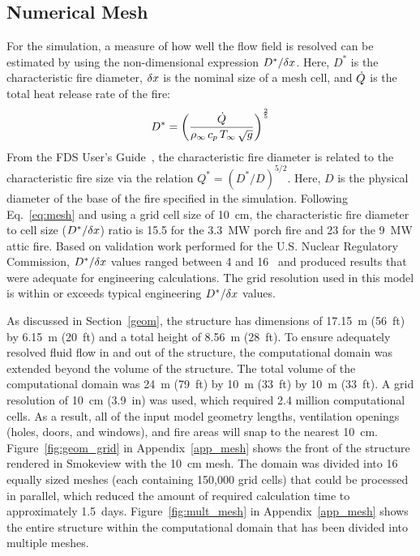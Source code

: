 \subsection{Numerical Mesh}
\label{mesh}

For the simulation, a measure of how well the flow field is resolved can be estimated by using the non-dimensional expression $D^*/\delta x$. Here, $D^*$ is the characteristic fire diameter, $\delta x$ is the nominal size of a mesh cell, and $\dot{Q}$ is the total heat release rate of the fire:
\begin{equation}
D^* = \left(
     \frac{\dot{Q}}{\rho_\infty \, c_p \, T_\infty \, \sqrt{g}}
     \right)^\frac{2}{5} 
\label{eq:mesh}
\end{equation}   
From the FDS User's Guide~\cite{FDS_Users_Guide}, the characteristic fire diameter is related to the characteristic fire size via the
relation $Q^* = (D^*/D)^{5/2}$. Here, $D$ is the physical diameter of the base of the fire specified in the simulation. Following Eq.~\ref{eq:mesh} and using a grid cell size of 10~cm, the characteristic fire diameter to cell size ($D^*/\delta x$) ratio is 15.5 for the 3.3~MW porch fire and 23 for the 9~MW attic fire. Based on validation work performed for the U.S. Nuclear Regulatory Commission, $D^*/\delta x$ values ranged between 4 and 16~\cite{NUREG_1824} and produced results that were adequate for engineering calculations. The grid resolution used in this model is within or exceeds typical engineering $D^*/\delta x$ values.

As discussed in Section~\ref{geom}, the structure has dimensions of 17.15~m (56~ft) by 6.15~m (20~ft) and a total height of 8.56~m (28~ft). To ensure adequately resolved fluid flow in and out of the structure, the computational domain was extended beyond the volume of the structure. The total volume of the computational domain was 24~m (79~ft) by 10~m (33~ft) by 10~m (33~ft). A grid resolution of 10~cm (3.9~in) was used, which required 2.4 million computational cells. As a result, all of the input model geometry lengths, ventilation openings (holes, doors, and windows), and fire areas will snap to the nearest 10~cm. Figure~\ref{fig:geom_grid} in Appendix~\ref{app_mesh} shows the front of the structure rendered in Smokeview with the 10~cm mesh. The domain was divided into 16 equally sized meshes (each containing 150,000 grid cells) that could be processed in parallel, which reduced the amount of required calculation time to approximately 1.5~days. Figure~\ref{fig:mult_mesh} in Appendix~\ref{app_mesh} shows the entire structure within the computational domain that has been divided into multiple meshes. 

